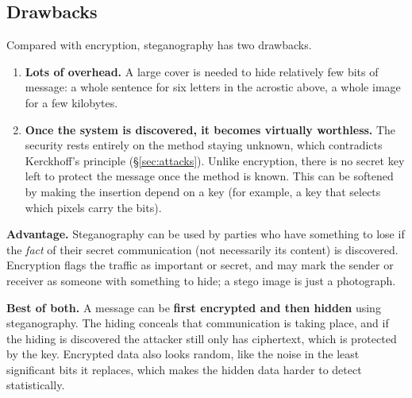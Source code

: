\subsection{Drawbacks}
Compared with encryption, steganography has two drawbacks.
\begin{enumerate}[leftmargin=1.5em]
  \item \textbf{Lots of overhead.} A large cover is needed to hide relatively few bits of message: a whole sentence for six letters in the acrostic above, a whole image for a few kilobytes.
  \item \textbf{Once the system is discovered, it becomes virtually worthless.} The security rests entirely on the method staying unknown, which contradicts Kerckhoff's principle (\S\ref{sec:attacks}). Unlike encryption, there is no secret key left to protect the message once the method is known. This can be softened by making the insertion depend on a key (for example, a key that selects which pixels carry the bits).
\end{enumerate}
\textbf{Advantage.} Steganography can be used by parties who have something to lose if the \emph{fact} of their secret communication (not necessarily its content) is discovered. Encryption flags the traffic as important or secret, and may mark the sender or receiver as someone with something to hide; a stego image is just a photograph.

\textbf{Best of both.} A message can be \textbf{first encrypted and then hidden} using steganography. The hiding conceals that communication is taking place, and if the hiding is discovered the attacker still only has ciphertext, which is protected by the key. Encrypted data also looks random, like the noise in the least significant bits it replaces, which makes the hidden data harder to detect statistically.
\begin{center}
\end{center}

